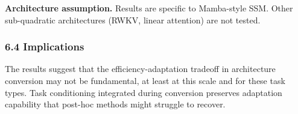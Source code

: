\textbf{Architecture assumption.} Results are specific to Mamba-style SSM. Other sub-quadratic architectures (RWKV, linear attention) are not tested.

\subsubsection{6.4 Implications}

The results suggest that the efficiency-adaptation tradeoff in architecture conversion may not be fundamental, at least at this scale and for these task types. Task conditioning integrated during conversion preserves adaptation capability that post-hoc methods might struggle to recover.


